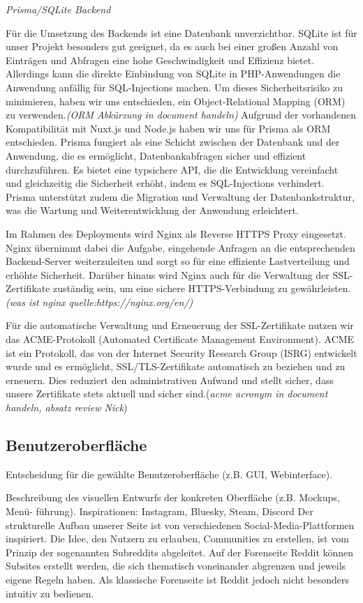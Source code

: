 \documentclass[a4paper,12pt]{article}
\begin{document}
\textit{Prisma/SQLite Backend }

Für die Umsetzung des Backends ist eine Datenbank unverzichtbar. SQLite ist für unser Projekt besonders gut geeignet, da es auch bei einer großen Anzahl von Einträgen und Abfragen eine hohe Geschwindigkeit und Effizienz bietet. Allerdings kann die direkte Einbindung von SQLite in PHP-Anwendungen die Anwendung anfällig für SQL-Injections machen. Um dieses Sicherheitsrisiko zu minimieren, haben wir uns entschieden, ein Object-Relational Mapping (ORM) zu verwenden.\textit{(ORM Abkürzung in document handeln)}
Aufgrund der vorhandenen Kompatibilität mit Nuxt.js und Node.js haben wir uns für Prisma als ORM entschieden. Prisma fungiert als eine Schicht zwischen der Datenbank und der Anwendung, die es ermöglicht, Datenbankabfragen sicher und effizient durchzuführen. Es bietet eine typsichere API, die die Entwicklung vereinfacht und gleichzeitig die Sicherheit erhöht, indem es SQL-Injections verhindert. Prisma unterstützt zudem die Migration und Verwaltung der Datenbankstruktur, was die Wartung und Weiterentwicklung der Anwendung erleichtert.

Im Rahmen des Deployments wird Nginx als Reverse HTTPS Proxy eingesetzt. Nginx übernimmt dabei die Aufgabe, eingehende Anfragen an die entsprechenden Backend-Server weiterzuleiten und sorgt so für eine effiziente Lastverteilung und erhöhte Sicherheit. Darüber hinaus wird Nginx auch für die Verwaltung der SSL-Zertifikate zuständig sein, um eine sichere HTTPS-Verbindung zu gewährleisten.\textit{(was ist nginx quelle:https://nginx.org/en/)}

Für die automatische Verwaltung und Erneuerung der SSL-Zertifikate nutzen wir das ACME-Protokoll (Automated Certificate Management Environment). ACME ist ein Protokoll, das von der Internet Security Research Group (ISRG) entwickelt wurde und es ermöglicht, SSL/TLS-Zertifikate automatisch zu beziehen und zu erneuern. Dies reduziert den administrativen Aufwand und stellt sicher, dass unsere Zertifikate stets aktuell und sicher sind.(\textit{acme acronym in document handeln, absatz review Nick})

\subsection{Benutzeroberfläche}
Entscheidung für die gewählte
Benutzeroberfläche (z.B. GUI, Webinterface).

Beschreibung des visuellen Entwurfs der konkreten Oberfläche (z.B. Mockups,
Menü- führung). Inspirationen: Instagram, Bluesky, Steam, Discord 
Der strukturelle Aufbau unserer Seite ist von verschiedenen Social-Media-Plattformen inspiriert. Die Idee, den Nutzern zu erlauben, Communities zu erstellen, ist vom Prinzip der sogenannten Subreddits abgeleitet. Auf der Forenseite Reddit können Subsites erstellt werden, die sich thematisch voneinander abgrenzen und jeweils eigene Regeln haben. Als klassische Forenseite ist Reddit jedoch nicht besonders intuitiv zu bedienen.
\end{document}

